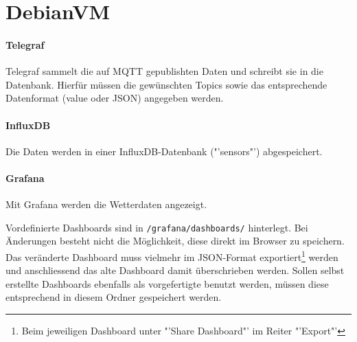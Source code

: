 \section{DebianVM}
\paragraph{Telegraf}
Telegraf sammelt die auf MQTT gepublishten Daten und schreibt sie in die Datenbank. Hierfür müssen die gewünschten Topics sowie das entsprechende Datenformat (value oder JSON) angegeben werden. 

\paragraph{InfluxDB}
Die Daten werden in einer InfluxDB-Datenbank ("'sensors"') abgespeichert.

\paragraph{Grafana}
Mit Grafana werden die Wetterdaten angezeigt. 

Vordefinierte Dashboards sind in \verb|/grafana/dashboards/| hinterlegt. Bei Änderungen besteht nicht die Möglichkeit, diese direkt im Browser zu speichern. Das veränderte Dashboard muss vielmehr im JSON-Format exportiert\footnote{Beim jeweiligen Dashboard unter "'Share Dashboard"' im Reiter "'Export"'} werden und anschliessend das alte Dashboard damit überschrieben werden. 
Sollen selbst erstellte Dashboards ebenfalls als vorgefertigte benutzt werden, müssen diese entsprechend in diesem Ordner gespeichert werden.


